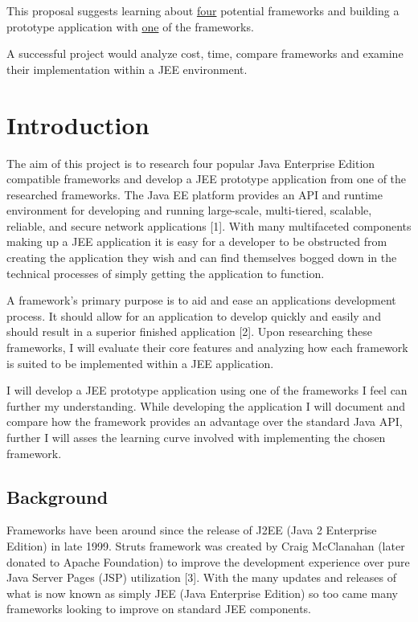 This proposal suggests learning about \underline{four} potential frameworks and building a prototype application with \underline{one} of the frameworks.

A successful project would analyze cost, time, compare frameworks and examine their implementation within a JEE environment.

\newpage

\section{Introduction}

The aim of this project is to research four popular Java Enterprise Edition compatible frameworks and develop a JEE prototype application from one of the researched frameworks. The Java EE platform provides an API and runtime environment for developing and running large-scale, multi-tiered, scalable, reliable, and secure network applications [1]. With many multifaceted components making up a JEE application it is easy for a developer to be obstructed from creating the application they wish and can find themselves bogged down in the technical processes of simply getting the application to function. 

A framework’s primary purpose is to aid and ease an applications development process. It should allow for an application to develop quickly and easily and should result in a superior finished application [2]. Upon researching these frameworks, I will evaluate their core features and analyzing how each framework is suited to be implemented within a JEE application.


I will develop a JEE prototype application using one of the frameworks I feel can further my understanding. While developing the application I will document and compare how the framework provides an advantage over the standard Java API, further I will asses the learning curve involved with implementing the chosen framework.

\subsection{Background}
Frameworks have been around since the release of J2EE (Java 2 Enterprise Edition) in late 1999. Struts framework was created by Craig McClanahan (later donated to Apache Foundation) to improve the development experience over pure Java Server Pages (JSP) utilization [3]. With the many updates and releases of what is now known as simply JEE (Java Enterprise Edition) so too came many frameworks looking to improve on standard JEE components. 

